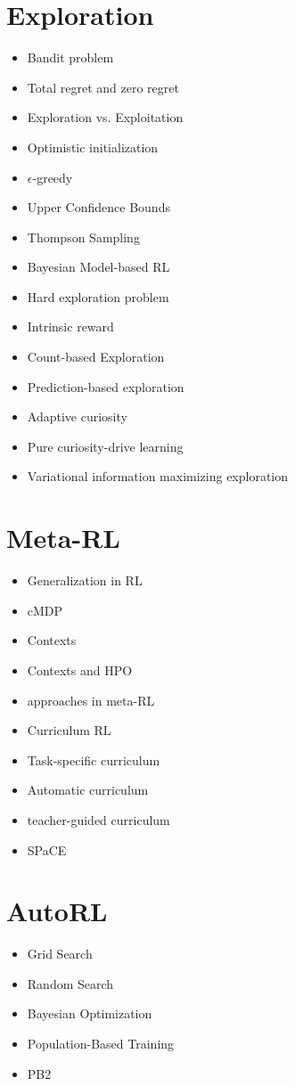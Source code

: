 \documentclass[]{article}
\begin{document}
\section{Exploration}

\begin{itemize}
\itemsep-0.5em
    \item Bandit problem
    \item Total regret and zero regret
    \item Exploration vs. Exploitation
    \item Optimistic initialization
    \item $\epsilon$-greedy
    \item Upper Confidence Bounds
    \item Thompson Sampling
    \item Bayesian Model-based RL
    \item Hard exploration problem
    \item Intrinsic reward
    \item Count-based Exploration
    \item Prediction-based exploration
    \item Adaptive curiosity
    \item Pure curiosity-drive learning
    \item Variational information maximizing exploration
\end{itemize}

\section{Meta-RL}

\begin{itemize}
\itemsep-0.5em
    \item Generalization in RL
    \item cMDP
    \item Contexts
    \item Contexts and HPO
    \item approaches in meta-RL
    \item Curriculum RL
    \item Task-specific curriculum
    \item Automatic curriculum
    \item teacher-guided curriculum
    \item SPaCE
\end{itemize}

\section{AutoRL}

\begin{itemize}
\itemsep-0.5em
    \item Grid Search
    \item Random Search
    \item Bayesian Optimization
    \item Population-Based Training
    \item PB2
\end{itemize}
\end{document}
